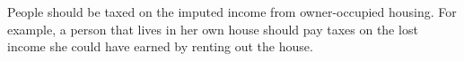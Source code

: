 People should be taxed on the imputed income from owner-occupied housing.
For example, a person that lives in her own house should pay taxes on the lost income she could have earned by renting out the house.